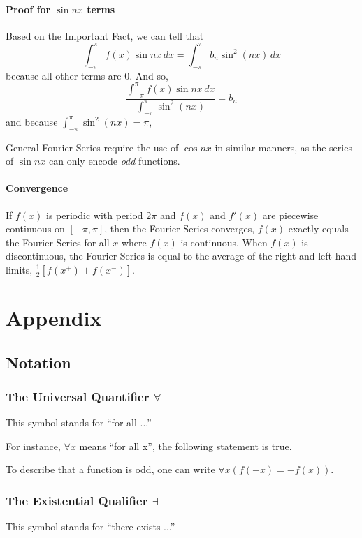 \documentclass{article}
\begin{document}
\paragraph{Proof for $\sin{nx}$ terms}
Based on the Important Fact, we can tell that
$$\int_{-\pi}^\pi f(x)\sin{nx}\,dx=\int_{-\pi}^\pi b_n \sin^2{\left(nx\right)}\,dx$$ because all other terms are $0$. And so,
$$\frac{\int_{-\pi}^\pi f(x)\sin{nx}\,dx}{\int_{-\pi}^\pi\sin^2{\left(nx\right)}}= b_n$$ and because $\int_{-\pi}^\pi\sin^2{\left(nx\right)}=\pi$,

General Fourier Series require the use of $\cos{nx}$ in similar manners, as the series of $\sin{nx}$ can only encode \emph{odd} functions.

\paragraph{Convergence}
If $f(x)$ is periodic with period $2\pi$ and $f(x)$ and $f'(x)$ are piecewise continuous on $[-\pi,\pi]$, then the Fourier Series converges, $f(x)$ exactly equals the Fourier Series for all $x$ where $f(x)$ is continuous. When $f(x)$ is discontinuous, the Fourier Series is equal to the average of the right and left-hand limits, $\frac{1}{2}\left[f(x^+)+f(x^-)\right]$.

\section{Appendix}
\subsection{Notation}
\subsubsection{\texorpdfstring{The Universal Quantifier $\forall$}{The Universal Quantifier}}
This symbol stands for ``for all ...''

For instance, $\forall x$ means ``for all x'', the following statement is true.

To describe that a function is odd, one can write $\forall x \left(f\left(-x\right) = -f\left(x\right)\right)$.

\subsubsection{\texorpdfstring{The Existential Qualifier $\exists$}{The Existential Qualifier}}
This symbol stands for ``there exists ...''
\end{document}
